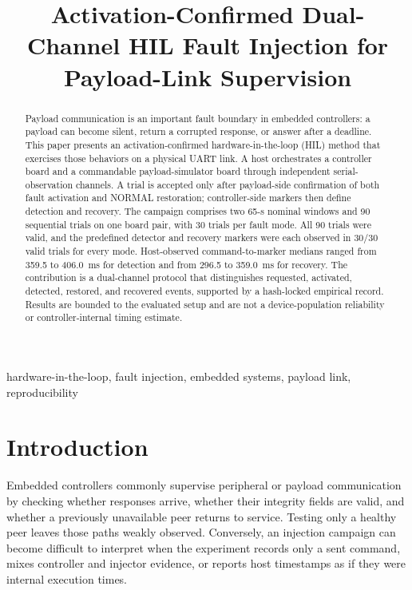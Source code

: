 \documentclass[conference]{IEEEtran}
\title{Activation-Confirmed Dual-Channel HIL Fault Injection for Payload-Link Supervision}
\author{}
\begin{document}
\maketitle

\begin{abstract}
Payload communication is an important fault boundary in embedded controllers: a payload can become silent, return a corrupted response, or answer after a deadline. This paper presents an activation-confirmed hardware-in-the-loop (HIL) method that exercises those behaviors on a physical UART link. A host orchestrates a controller board and a commandable payload-simulator board through independent serial-observation channels. A trial is accepted only after payload-side confirmation of both fault activation and NORMAL restoration; controller-side markers then define detection and recovery. The campaign comprises two 65-s nominal windows and 90 sequential trials on one board pair, with 30 trials per fault mode. All 90 trials were valid, and the predefined detector and recovery markers were each observed in 30/30 valid trials for every mode. Host-observed command-to-marker medians ranged from 359.5 to 406.0~ms for detection and from 296.5 to 359.0~ms for recovery. The contribution is a dual-channel protocol that distinguishes requested, activated, detected, restored, and recovered events, supported by a hash-locked empirical record. Results are bounded to the evaluated setup and are not a device-population reliability or controller-internal timing estimate.
\end{abstract}

\begin{IEEEkeywords}
hardware-in-the-loop, fault injection, embedded systems, payload link, reproducibility
\end{IEEEkeywords}

\section{Introduction}

Embedded controllers commonly supervise peripheral or payload communication by checking whether responses arrive, whether their integrity fields are valid, and whether a previously unavailable peer returns to service. Testing only a healthy peer leaves those paths weakly observed. Conversely, an injection campaign can become difficult to interpret when the experiment records only a sent command, mixes controller and injector evidence, or reports host timestamps as if they were internal execution times.
\end{document}
